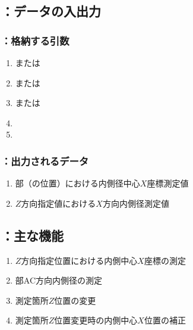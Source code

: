 \subsection{\MXIWidth：データの入出力}

\subsubsection{\MXIWidth：格納する引数}
\begin{enumerate}[label*=\sarrow]
\item \PMTopEndACID または\PMBottomEndACID
\item \PMTopReAlocationLength または\PMBottomReAlocationLength
\item \PMTopAlocationLength または\PMBottomAlocationLength
\item \PMCenterCurvatureRadius
\item \PMPlatingThk
\end{enumerate}

\subsubsection{\MXIWidth：出力されるデータ}
\begin{enumerate}[label*=\sarrow]
\item \EndFace 部（\ReAlocationLength の位置）における内側径中心$X$座標測定値
\item $Z$方向指定値における$X$方向内側径測定値
\end{enumerate}



\subsection{\MXIWidth：主な機能}
\begin{enumerate}[label*=\sarrow]
\item $Z$方向指定位置における内側中心$X$座標の測定
\item \EndFace 部AC方向内側径の測定
\item 測定箇所$Z$位置の変更
\item 測定箇所$Z$位置変更時の内側中心$X$位置の補正
\end{enumerate}


